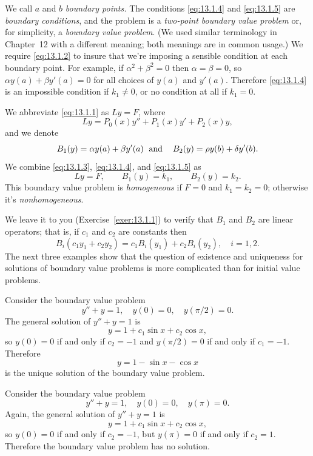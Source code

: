 We call $a$ and $b$ \emph{boundary points.} The conditions \eqref{eq:13.1.4} and \eqref{eq:13.1.5}
are \emph{boundary conditions}, and the problem is a \emph{two-point boundary value problem} or, for
simplicity, a \emph{boundary value problem}. (We used similar terminology in Chapter~12 with a
different meaning; both meanings are in common usage.) We require \eqref{eq:13.1.2} to insure that
we're imposing a sensible condition at each boundary point. For example, if $\alpha^{2}+\beta^{2}=0$
then $\alpha=\beta=0$, so $\alpha y(a)+\beta y'(a)=0$ for all choices of $y(a)$ and $y'(a)$.
Therefore \eqref{eq:13.1.4} is an impossible condition if $k_{1}\ne0$, or no condition at all if
$k_{1}=0$.

We abbreviate \eqref{eq:13.1.1} as $Ly=F$, where
\[
  Ly=P_{0}(x)y''+P_{1}(x)y'+P_{2}(x)y,
\]
and we denote
\[
  B_{1}(y)=\alpha y(a)+\beta y'(a) \text{\; and\; \; }B_{2}(y)=\rho y(b)+\delta y'(b).
\]
We combine \eqref{eq:13.1.3}, \eqref{eq:13.1.4}, and \eqref{eq:13.1.5} as
\begin{equation}
  \label{eq:13.1.6}Ly=F,\quad\quad B_{1}(y)=k_{1},\quad\quad B_{2}(y)=k_{2}.
\end{equation}
This boundary value problem is \emph{homogeneous} if $F=0$ and $k_{1}=k_{2}=0$; otherwise it's
\emph{nonhomogeneous}.

We leave it to you (Exercise~\ref{exer:13.1.1}) to verify that $B_{1}$ and $B_{2}$ are linear
operators; that is, if $c_{1}$ and $c_{2}$ are constants then
\begin{equation}
  \label{eq:13.1.7}B_{i}(c_{1}y_{1}+c_{2}y_{2})=c_{1}B_{i}(y_{1})+c_{2}B_{i}(y_{2}),\quad i=1,2.
\end{equation}
The next three examples show that the question of existence and uniqueness for solutions of boundary
value problems is more complicated than for initial value problems.

\begin{example}
  \label{example:13.1.1} \rm Consider the boundary value problem
  \[
    y''+y=1,\quad y(0)=0,\quad y(\pi/2)=0.
  \]
  The general solution of $y''+y=1$ is
  \[
    y=1+c_{1}\sin x+c_{2}\cos x,
  \]
  so $y(0)=0$ if and only if $c_{2}=-1$ and $y(\pi/2)=0$ if and only if $c_{1}=-1$. Therefore
  \[
    y=1-\sin x-\cos x
  \]
  is the unique solution of the boundary value problem.
\end{example}

\begin{example}
  \label{example:13.1.2} \rm Consider the boundary value problem
  \[
    y''+y=1,\quad y(0)=0,\quad y(\pi)=0.
  \]
  Again, the general solution of $y''+y=1$ is
  \[
    y=1+c_{1}\sin x+c_{2}\cos x,
  \]
  so $y(0)=0$ if and only if $c_{2}=-1$, but $y(\pi)=0$ if and only if $c_{2}=1$. Therefore the
  boundary value problem has no solution.
\end{example}


